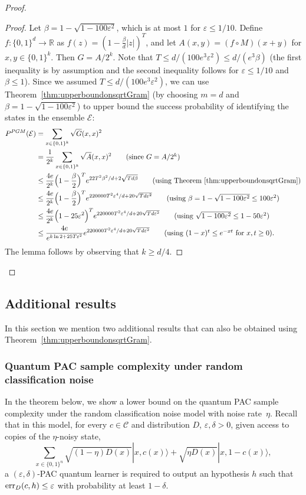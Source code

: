 \documentclass[twoside,11pt]{article}
\newcommand{\eps}{\varepsilon}
\newcommand{\ket}[1]{|#1\rangle}
\newcommand{\err}{\mbox{\rm err}}
\newcommand{\E}{\mathcal{E}}
\newcommand{\R}{\ensuremath{\mathbb{R}}}
\def\01{\{0,1\}}
\newcommand{\C}{\ensuremath{\mathscr{C}}}
\begin{document}
\begin{proof}
\begin{proof}
		\hspace{-3pt}Let $\beta=1-\sqrt{1-100\eps^2}$, which is at most $1$ for $\eps\leq 1/10$. 
		Define $f:\01^{d}\rightarrow \R$ as $f(z)=(1-\frac{\beta}{d}|z|)^T$, and let $A(x,y)=(f\circ M)(x+y)$ for $x,y\in \01^k$. Then $G=A/2^k$. Note that  $T\leq d/(100e^3\eps^2)\leq d/(e^3\beta)$ (the first inequality is by assumption and the second inequality follows for $\eps\leq 1/10$ and $\beta\leq 1$). Since we assumed $T\leq d/(100e^3 \eps^2)$, we can use Theorem~\ref{thm:upperboundonsqrtGram} (by choosing $m=d$ and $\beta=1-\sqrt{1-100\eps^2}$) to upper bound the success probability of identifying the states in the ensemble $\E$: 
		\begin{align*}
		P^{PGM}(\E)&=\sum_{x\in \01^k} \sqrt{G}(x,x)^2 \\
		&=\frac{1}{2^k}\sum_{x\in \01^k} \sqrt{A}(x,x)^2 \tag{since $G=A/2^k$}\\
		&\leq  \frac{4e}{2^{k}}\Big(1-\frac{\beta}{2}\Big)^{T} e^{22T^2\beta^2/d+2\sqrt{Td\beta}}  \tag{using Theorem~\ref{thm:upperboundonsqrtGram}} \\
		&\leq   \frac{4e}{2^{k}}\Big(1-\frac{\beta}{2}\Big)^{T} e^{220000T^2\eps^4/d+20\sqrt{Td \eps^2}}     \tag{using $\beta=1-\sqrt{1-100\eps^2}\leq 100\eps^2$}\\
		&\leq \frac{4e}{2^k}\Big(1-25\eps^2\Big)^{T} e^{220000T^2\eps^4/d+20\sqrt{Td \eps^2}}    \tag{using $\sqrt{1-100\eps^2} \leq 1-50\eps^2$}\\
		&\leq \frac{4e}{e^{k\ln 2+25T\eps^2}} e^{220000T^2\eps^4/d+20\sqrt{Td \eps^2}}   \tag{using $(1-x)^t\leq e^{-xt}$ for $x,t\geq 0$}.
		\end{align*}
		The lemma follows by observing that $k\geq d/4$.
	\end{proof} 
\vspace{-3pt}
\end{proof}

\subsection{Additional results}

In this section we mention two additional results that can also be obtained using Theorem~\ref{thm:upperboundonsqrtGram}.

\subsubsection{Quantum PAC sample complexity under random classification noise}
In the theorem below, we show a lower bound on the quantum PAC sample complexity under the random classification noise model with noise rate~$\eta$. Recall that in this model, for every $c\in \C$ and distribution $D$, $\eps,\delta > 0$, given access to copies of the $\eta$-noisy state, 
$$
\sum_{x\in\01^n}\sqrt{(1-\eta)D(x)}\ket{x,c(x)}+\sqrt{\eta D(x)}\ket{x,1-c(x)},
$$
a $(\eps,\delta)$-PAC quantum learner is required to output an hypothesis $h$ such that $\err_D(c,h)\leq \eps$ with probability at least $1-\delta$.
\end{document}
